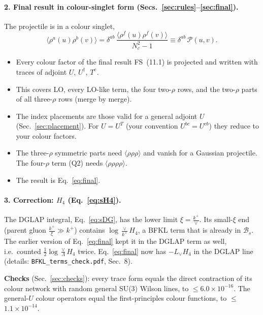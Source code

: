 \documentclass[10pt]{article}
\numberwithin{equation}{section}
\newcommand{\new}[1]{{\color{blue}#1}}
\newcommand{\Lv}{L_{\vee}}
\newcommand{\BB}{\mathcal B}
\newcommand{\PP}{\mathcal P}
\begin{document}
\paragraph{2. Final result in colour-singlet form (Secs.~\ref{sec:rules}--\ref{sec:final}).} The projectile is in a colour singlet,
\begin{equation*}
\langle\rho^a(u)\rho^b(v)\rangle=\delta^{ab}\,\frac{\langle\rho^f(u)\rho^f(v)\rangle}{N_c^2-1}\equiv\delta^{ab}\,\PP(u,v).
\end{equation*}
\begin{itemize}
\item Every colour factor of the final result FS~(11.1) is projected and written with traces of adjoint $U$, $U^\dagger$, $T^e$.
\item This covers LO, every LO-like term, the four two-$\rho$ rows, and the two-$\rho$ parts of all three-$\rho$ rows (merge by merge).
\item The index placements are those valid for a general adjoint $U$ (Sec.~\ref{sec:placement}). For $U=U^T$ (your convention $U^{bc}=U^{cb}$) they reduce to your colour factors.
\item The three-$\rho$ symmetric parts need $\langle\rho\rho\rho\rangle$ and vanish for a Gaussian projectile. The four-$\rho$ term (Q2) needs $\langle\rho\rho\rho\rho\rangle$.
\item The result is Eq.~\eqref{eq:final}.
\end{itemize}
\paragraph{\new{3. Correction: $H_4$ (Eq.~\eqref{eq:sH4}).}} \new{The DGLAP integral, Eq.~\eqref{eq:sDG}, has the lower limit $\xi=\frac{k^+}{\vee}$. Its small-$\xi$ end (parent gluon $\frac{k^+}{\xi}\gg k^+$) contains $\log\frac{\vee}{k^+}H_4$, a BFKL term that is already in $\BB_s$. The earlier version of Eq.~\eqref{eq:final} kept it in the DGLAP term as well, i.e.\ counted $\frac12\log\frac\vee\Lambda H_4$ twice. Eq.~\eqref{eq:final} now has $-\Lv H_4$ in the DGLAP line (details: \texttt{BFKL\_terms\_check.pdf}, Sec.~8).}

\textbf{Checks} (Sec.~\ref{sec:checks}): every trace form equals the direct contraction of its colour network with random general SU(3) Wilson lines, to $\le$$6.0\times10^{-16}$. The general-$U$ colour operators equal the first-principles colour functions, to $\le$$1.1\times10^{-14}$.

\end{document}
